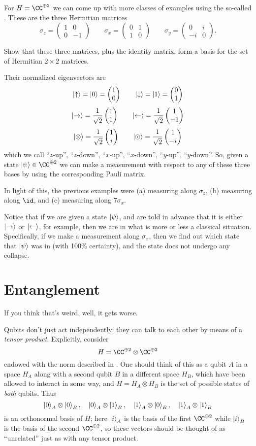 \documentclass[11pt]{scrreprt}
\begin{document}
For $H = \CC^{\oplus 2}$ we can come up with more classes of examples using
the so-called .
These are the three Hermitian matrices
\[
	\sigma_z = \begin{pmatrix} 1 & 0 \\ 0 & -1 \end{pmatrix}
	\qquad
	\sigma_x = \begin{pmatrix} 0 & 1 \\ 1 & 0 \end{pmatrix}
	\qquad
	\sigma_y = \begin{pmatrix} 0 & i \\ -i & 0 \end{pmatrix}.
\]
\begin{ques}
	Show that these three matrices, plus the identity matrix,
	form a basis for the set of Hermitian $2 \times 2$ matrices.
\end{ques}
Their normalized eigenvectors are
\[ \ket\uparrow = \ket0 = \begin{pmatrix} 1 \\ 0 \end{pmatrix} \qquad \ket\downarrow = \ket1 = \begin{pmatrix} 0 \\ 1 \end{pmatrix} \]
\[ \ket\rightarrow = \frac{1}{\sqrt2}\begin{pmatrix} 1 \\ 1 \end{pmatrix}
	\qquad \ket\leftarrow = \frac{1}{\sqrt2}\begin{pmatrix} 1 \\ -1 \end{pmatrix} \]
\[ \ket\otimes = \frac{1}{\sqrt2}\begin{pmatrix} 1 \\ i \end{pmatrix}
	\qquad \ket\odot = \frac{1}{\sqrt2}\begin{pmatrix} 1 \\ -i \end{pmatrix} \]
which we call ``$z$-up'', ``$z$-down'',
``$x$-up'', ``$x$-down'', ``$y$-up'', ``$y$-down''.
So, given a state $\ket\psi \in \CC^{\oplus 2}$
we can make a measurement with respect to any of these three bases
by using the corresponding Pauli matrix.

In light of this, the previous examples were (a) measuring along $\sigma_z$,
(b) measuring along $\id$, and (c) measuring along $7\sigma_x$.

Notice that if we are given a state $\ket\psi$,
and are told in advance that it is either $\ket\rightarrow$ or $\ket\leftarrow$,
for example, then we are in what is more or less a classical situation.
Specifically, if we make a measurement along $\sigma_x$,
then we find out which state that $\ket\psi$ was in (with 100\% certainty),
and the state does not undergo any collapse.

\section{Entanglement}
If you think that's weird, well, it gets worse.

Qubits don't just act independently:
they can talk to each other by means of a \emph{tensor product}.
Explicitly, consider \[ H = \CC^{\oplus 2} \otimes \CC^{\oplus 2} \]
endowed with the norm described in .
One should think of this as a qubit $A$ in a space $H_A$
along with a second qubit $B$ in a different space $H_B$,
which have been allowed to interact in some way,
and $H = H_A \otimes H_B$ is the set of possible states of \emph{both} qubits.
Thus
\[ 
	\ket{0}_A \otimes \ket{0}_B, \quad
	\ket{0}_A \otimes \ket{1}_B, \quad
	\ket{1}_A \otimes \ket{0}_B, \quad
	\ket{1}_A \otimes \ket{1}_B
\]
is an orthonormal basis of $H$;
here $\ket{i}_A$ is the basis of the first $\CC^{\oplus 2}$
while $\ket{i}_B$ is the basis of the second $\CC^{\oplus 2}$,
so these vectors should be thought of as ``unrelated''
just as with any tensor product.
\end{document}
